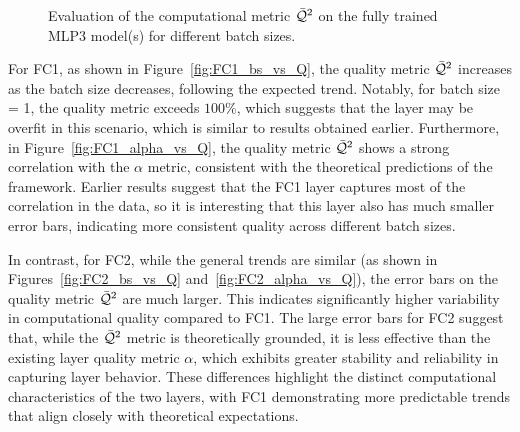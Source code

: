 \begin{figure}[ht]
{        \label{fig:FC2_bs_vs_Q}
    }
    \hspace{1cm} %
    \caption{
      Evaluation of the computational \RTransform \LayerQualitySquared metric $\bar{\mathcal{Q}}^{2}$
      on the fully trained MLP3 model(s) for different batch sizes.
    }
    \label{fig:MLP3_qualities}
\end{figure}


For FC1, as shown in Figure~\ref{fig:FC1_bs_vs_Q}, the quality metric \(\bar{\mathcal{Q}}^{2}\) increases as the batch size decreases, following the expected trend. Notably, for batch size = 1, the quality metric exceeds $100\%$,
which suggests that the layer may be overfit in this scenario, which is similar to results obtained earlier. Furthermore, in Figure~\ref{fig:FC1_alpha_vs_Q}, the quality metric \(\bar{\mathcal{Q}}^{2}\) shows a strong correlation with the $\alpha$ metric, consistent with the theoretical predictions of the \HTSR framework.
Earlier results suggest that the FC1 layer captures most of the correlation in the data,
so it is interesting that this layer also has much smaller error bars, indicating more consistent quality across different batch sizes.

In contrast, for FC2, while the general trends are similar (as shown in Figures~\ref{fig:FC2_bs_vs_Q} and~\ref{fig:FC2_alpha_vs_Q}), the error bars on the quality metric $\bar{\mathcal{Q}}^{2}$ are much larger. This indicates significantly higher variability in computational quality compared to FC1. The large error bars for FC2 suggest that, while the $\bar{\mathcal{Q}}^{2}$ metric is theoretically grounded, it is less effective than the existing \HTSR layer quality metric $\alpha$, which exhibits greater stability and reliability in capturing layer behavior. These differences highlight the distinct computational characteristics of the two layers, with FC1 demonstrating more predictable trends that align closely with theoretical expectations.

